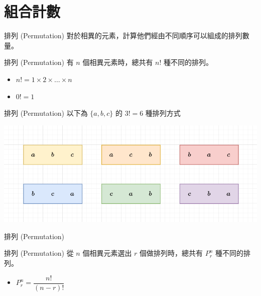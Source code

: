 \documentclass[aspectratio=169]{beamer}
\begin{document}
    \section{組合計數}
    
    \begin{frame}{排列 (Permutation)}
        對於相異的元素，計算他們經由不同順序可以組成的排列數量。
        \begin{alertblock}{排列 (Permutation)}
            有 $n$ 個相異元素時，總共有 $n!$ 種不同的排列。 
            \begin{itemize}
                \item $n! = 1 \times 2 \times \dots \times n$
                \item $0! = 1$
            \end{itemize}
        \end{alertblock}
    \end{frame}
    
    \begin{frame}{排列 (Permutation)}
        以下為 $\{a,b,c\}$ 的 $3! = 6$ 種排列方式
        \begin{center}
            \includegraphics[width=\textwidth]{images/permutation.png}
        \end{center}
    \end{frame}
    
    \begin{frame}{排列 (Permutation)}
        \begin{alertblock}{排列 (Permutation)}
            從 $n$ 個相異元素選出 $r$ 個做排列時，總共有 $P^n_r$ 種不同的排列。 
            \begin{itemize}
                \item $P^n_r = \dfrac{n!}{(n-r)!}$
            \end{itemize}
        \end{alertblock}
    \end{frame}
    
\end{document}

